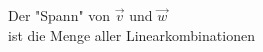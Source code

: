 \documentclass[preview]{standalone}
\begin{document}
\begin{center}
Der "Spann" von $\vec{v}$ und $\vec{w}$\\ist die Menge aller Linearkombinationen
\end{center}
\end{document}
